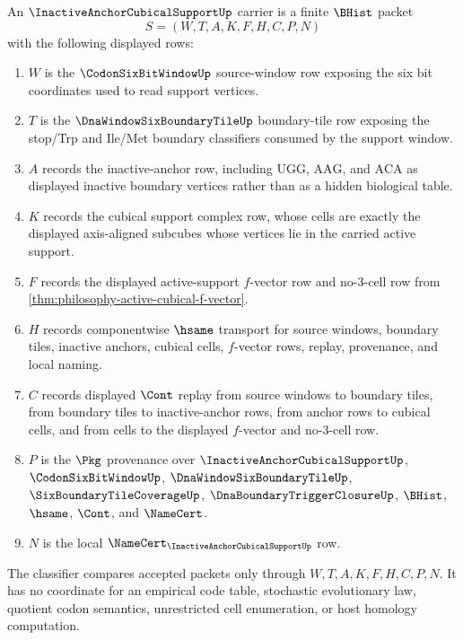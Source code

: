 \begin{definition}
\label{def:inactive-anchor-cubical-support-carrier}
An $\InactiveAnchorCubicalSupportUp$ carrier is a finite $\BHist$ packet
$$
S=(W,T,A,K,F,H,C,P,N)
$$
with the following displayed rows:
\begin{enumerate}
\item $W$ is the $\CodonSixBitWindowUp$ source-window row exposing the six bit coordinates used to read support vertices.
\item $T$ is the $\DnaWindowSixBoundaryTileUp$ boundary-tile row exposing the stop/Trp and Ile/Met boundary classifiers consumed by the support window.
\item $A$ records the inactive-anchor row, including $\mathrm{UGG}$, $\mathrm{AAG}$, and $\mathrm{ACA}$ as displayed inactive boundary vertices rather than as a hidden biological table.
\item $K$ records the cubical support complex row, whose cells are exactly the displayed axis-aligned subcubes whose vertices lie in the carried active support.
\item $F$ records the displayed active-support $f$-vector row and no-$3$-cell row from \autoref{thm:philosophy-active-cubical-f-vector}.
\item $H$ records componentwise $\hsame$ transport for source windows, boundary tiles, inactive anchors, cubical cells, $f$-vector rows, replay, provenance, and local naming.
\item $C$ records displayed $\Cont$ replay from source windows to boundary tiles, from boundary tiles to inactive-anchor rows, from anchor rows to cubical cells, and from cells to the displayed $f$-vector and no-$3$-cell row.
\item $P$ is the $\Pkg$ provenance over $\InactiveAnchorCubicalSupportUp$, $\CodonSixBitWindowUp$, $\DnaWindowSixBoundaryTileUp$, $\SixBoundaryTileCoverageUp$, $\DnaBoundaryTriggerClosureUp$, $\BHist$, $\hsame$, $\Cont$, and $\NameCert$.
\item $N$ is the local $\NameCert_{\InactiveAnchorCubicalSupportUp}$ row.
\end{enumerate}
The classifier compares accepted packets only through $W,T,A,K,F,H,C,P,N$. It has no coordinate for an empirical code table, stochastic evolutionary law, quotient codon semantics, unrestricted cell enumeration, or host homology computation.
\end{definition}

